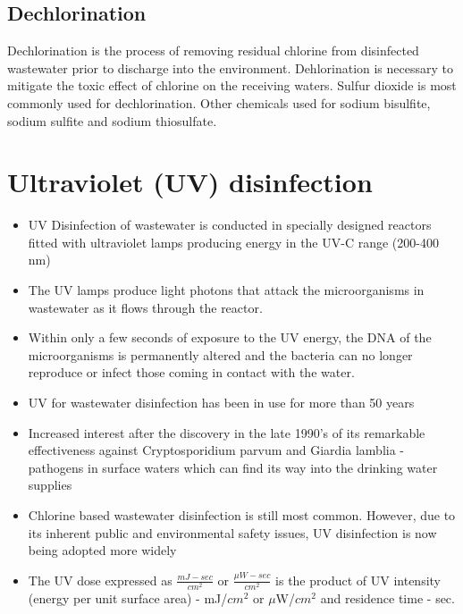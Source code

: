\subsection{Dechlorination}		

Dechlorination is the process of removing residual chlorine from disinfected wastewater prior to discharge into the environment. Dehlorination is necessary to mitigate the toxic effect of chlorine on the receiving waters.  Sulfur dioxide is most commonly used for dechlorination.  Other chemicals used for sodium bisulfite, sodium sulfite and sodium thiosulfate.\\




\section{Ultraviolet (UV) disinfection}

\begin{itemize}
	\item UV Disinfection of wastewater is conducted in specially designed reactors fitted with ultraviolet lamps producing energy in the UV-C range (200-400 nm)
	\item The UV lamps produce light photons that attack the microorganisms in wastewater as it flows through the reactor. 
	\item Within only a few seconds of exposure to the UV energy, the DNA of the microorganisms is permanently altered and the bacteria can no longer reproduce or infect those coming in contact with the water. 
	\item UV for wastewater disinfection has been in use for more than 50 years
	\item Increased interest after the discovery in the late 1990's of its remarkable effectiveness against Cryptosporidium parvum and Giardia lamblia - pathogens in surface waters which can find its way into the drinking water supplies
	\item Chlorine based wastewater disinfection is still most common.  However, due to its inherent public and environmental safety issues, UV disinfection is now being adopted more widely
	\item The UV dose expressed as $\frac{mJ-sec}{cm^2}$ or $\frac{\mu W-sec}{cm^2}$ is the product of UV intensity (energy per unit surface area) - mJ/$cm^2$ or $\mu$W/$cm^2$ and residence time - sec.  

\end{itemize}

